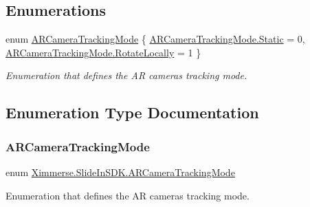 \subsection*{Enumerations}
\begin{DoxyCompactItemize}
\item 
enum \mbox{\hyperlink{namespace_ximmerse_1_1_slide_in_s_d_k_afe4bdc1d1705000eb90aaef87e0fa464}{A\+R\+Camera\+Tracking\+Mode}} \{ \mbox{\hyperlink{namespace_ximmerse_1_1_slide_in_s_d_k_afe4bdc1d1705000eb90aaef87e0fa464a84a8921b25f505d0d2077aeb5db4bc16}{A\+R\+Camera\+Tracking\+Mode.\+Static}} = 0, 
\mbox{\hyperlink{namespace_ximmerse_1_1_slide_in_s_d_k_afe4bdc1d1705000eb90aaef87e0fa464ac54bdcf3e5df45cf43e712622472572b}{A\+R\+Camera\+Tracking\+Mode.\+Rotate\+Locally}} = 1
 \}
\begin{DoxyCompactList}\small\item\em Enumeration that defines the AR camera\textquotesingle{}s tracking mode. \end{DoxyCompactList}\end{DoxyCompactItemize}


\subsection{Enumeration Type Documentation}
\mbox{\label{namespace_ximmerse_1_1_slide_in_s_d_k_afe4bdc1d1705000eb90aaef87e0fa464}} 
\subsubsection{\texorpdfstring{A\+R\+Camera\+Tracking\+Mode}{ARCameraTrackingMode}}
{\footnotesize\ttfamily enum \mbox{\hyperlink{namespace_ximmerse_1_1_slide_in_s_d_k_afe4bdc1d1705000eb90aaef87e0fa464}{Ximmerse.\+Slide\+In\+S\+D\+K.\+A\+R\+Camera\+Tracking\+Mode}}\hspace{0.3cm}{\ttfamily [strong]}}



Enumeration that defines the AR camera\textquotesingle{}s tracking mode. 

